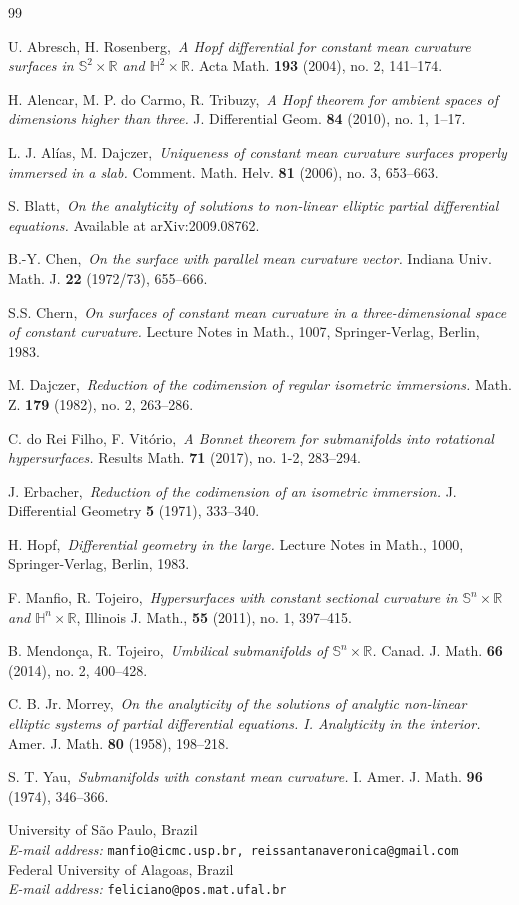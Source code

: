 \documentclass[11pt,a4paper]{article}
\makeatletter
\numberwithin{equation}{section}
\newcommand{\R}{\mathbb{R}}
\newcommand{\Sp}{\mathbb{S}}
\newcommand{\Hy}{\mathbb{H}}
\newcommand{\Addresses}{{
\bigskip 
\footnotesize
University of S\~ao Paulo, Brazil \\
\textit{E-mail address:} \texttt{manfio@icmc.usp.br, reissantanaveronica@gmail.com}
\vspace{.2cm} \\
Federal University of Alagoas, Brazil \\
\textit{E-mail address:} \texttt{feliciano@pos.mat.ufal.br}
}}
\makeatother
\begin{document}


\begin{thebibliography}{99}

 U. Abresch, H. Rosenberg,\ {\em A Hopf differential for constant mean curvature surfaces in $\Sp^2\times\R$ and $\Hy^2\times\R$.} Acta Math. {\bf 193} (2004), no. 2, 141--174.

 H. Alencar, M. P. do Carmo, R. Tribuzy,\ {\em A Hopf theorem for ambient spaces of dimensions higher than three.} J. Differential Geom. {\bf 84} (2010), no. 1, 1--17.

 L. J. Alías, M. Dajczer,\ {\em Uniqueness of constant mean curvature surfaces properly immersed in a slab.} Comment. Math. Helv. {\bf 81} (2006), no. 3, 653--663.

 S. Blatt,\ {\em On the analyticity of solutions to non-linear elliptic partial differential equations.} Available at arXiv:2009.08762.

 B.-Y. Chen,\ {\em On the surface with parallel mean curvature vector.} Indiana Univ. Math. J. {\bf 22} (1972/73), 655--666.

 S.S. Chern,\ {\em On surfaces of constant mean curvature in a three-dimensional space of constant curvature.} Lecture Notes in Math., 1007, Springer-Verlag, Berlin, 1983.

 M. Dajczer,\ {\em Reduction of the codimension of regular isometric immersions.} Math. Z. {\bf 179} (1982), no. 2, 263--286.

 C. do Rei Filho, F. Vitório,\ {\em A Bonnet theorem for submanifolds into rotational hypersurfaces.} Results Math. {\bf 71} (2017), no. 1-2, 283--294.

 J. Erbacher,\ {\em Reduction of the codimension of an isometric immersion.} J. Differential Geometry {\bf 5} (1971), 333--340.

 H. Hopf,\ {\em Differential geometry in the large.} Lecture Notes in Math., 1000, Springer-Verlag, Berlin, 1983.

 F. Manfio, R. Tojeiro,\ {\em Hypersurfaces with constant sectional curvature in $\Sp^n\times\R$ and $\Hy^n\times\R$}, Illinois J. Math., {\bf 55} (2011), no. 1, 397--415.

 B. Mendon\c ca, R. Tojeiro,\ {\em Umbilical submanifolds of $\Sp^n\times\R$.} Canad. J. Math. {\bf 66} (2014), no. 2, 400--428.

 C. B. Jr. Morrey,\ {\em On the analyticity of the solutions of analytic non-linear elliptic systems of partial differential equations. I. Analyticity in the interior.} Amer. J. Math. {\bf 80} (1958), 198--218.


 S. T. Yau,\ {\em Submanifolds with constant mean curvature.} I. Amer. J. Math. {\bf 96} (1974), 346--366.

\end{thebibliography}
\Addresses
\end{document}
